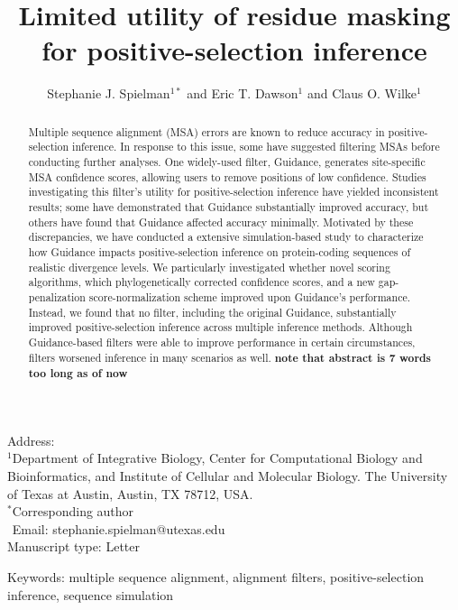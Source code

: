 \documentclass[11pt]{article}
\begin{document}
\title{\textbf{Limited utility of residue masking for positive-selection inference}}
\author{Stephanie J. Spielman$^{1*}$ and Eric T. Dawson$^{1}$ and Claus O. Wilke$^{1}$}
\date{}

\maketitle
\noindent
Address:\\
$^1$Department of Integrative Biology, Center for Computational Biology and Bioinformatics, and Institute of Cellular and Molecular Biology.
The University of Texas at Austin, Austin, TX 78712, USA.\\

\bigskip
\noindent
$^*$Corresponding author\\
$\phantom{^*}$Email: stephanie.spielman@utexas.edu\\

\bigskip
\noindent
Manuscript type: Letter

\bigskip
\noindent Keywords: multiple sequence alignment, alignment filters, positive-selection inference, sequence simulation

\newpage
\begin{abstract}
Multiple sequence alignment (MSA) errors are known to reduce accuracy in positive-selection inference. In response to this issue, some have suggested filtering MSAs before conducting further analyses. One widely-used filter, Guidance, generates site-specific MSA confidence scores, allowing users to remove positions of low confidence. Studies investigating this filter's utility for positive-selection inference have yielded inconsistent results; some have demonstrated that Guidance substantially improved accuracy, but others have found that Guidance affected accuracy minimally. Motivated by these discrepancies, we have conducted a extensive simulation-based study to characterize how Guidance impacts positive-selection inference on protein-coding sequences of realistic divergence levels. We particularly investigated whether novel scoring algorithms, which phylogenetically corrected confidence scores, and a new gap-penalization score-normalization scheme improved upon Guidance's performance. Instead, we found that no filter, including the original Guidance, substantially improved positive-selection inference across multiple inference methods. Although Guidance-based filters were able to improve performance in certain circumstances, filters worsened inference in many scenarios as well. \textbf{note that abstract is 7 words too long as of now}
\end{abstract}
\end{document}
